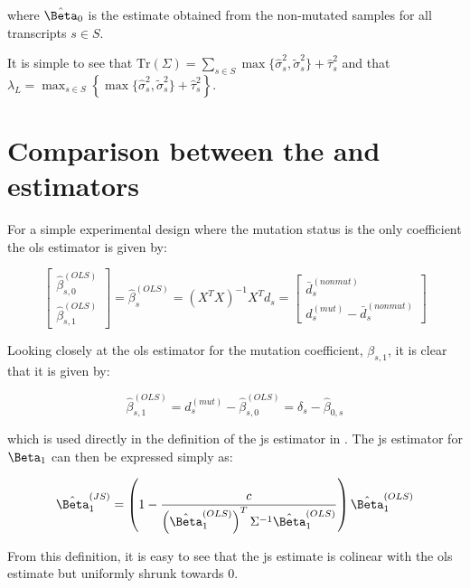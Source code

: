 where $\hat{\Beta}_0$ is the estimate obtained from the non-mutated samples for all transcripts $s \in S$.

It is simple to see that $\text{Tr}(\Sigma) = \sum_{s \in S} \max\{ \hat{\sigma}_s^2, \tilde{\sigma}_s^2 \} + \hat{\tau}_s^2$ and that $\lambda_L = \max_{s \in S} \left\{ \max\{ \hat{\sigma}_s^2, \tilde{\sigma}_s^2 \} + \hat{\tau}_s^2 \right\}$.

\section{Comparison between the  and  estimators}

For a simple experimental design where the mutation status is the only coefficient the \gls{ols} estimator is given by:

\begin{equation*}
  \begin{bmatrix}
    \hat{\beta}_{s,0}^{(OLS)} \\
    \hat{\beta}_{s,1}^{(OLS)}
  \end{bmatrix}
  = \hat{\beta}_s^{(OLS)}
  = (X^TX)^{-1}X^T d_s
  = \begin{bmatrix}
    \bar{d}_s^{(nonmut)} \\
    d_s^{(mut)} - \bar{d}_s^{(nonmut)}
  \end{bmatrix}
\end{equation*}

Looking closely at the \gls{ols} estimator for the mutation coefficient, $\beta_{s,1}$, it is clear that it is given by:

\begin{equation}
  \hat{\beta}_{s,1}^{(OLS)} = d_s^{(mut)} - \hat{\beta}_{s,0}^{(OLS)} = \delta_s - \hat{\beta}_{0,s}
\end{equation}

which is used directly in the definition of the \gls{js} estimator in .
The \gls{js} estimator for $\Beta_1$ can then be expressed simply as:

\begin{equation}
  \hat{\Beta}_1^{(JS)} = \left( 1 - \frac{c}{\left( \hat{\Beta}_1^{(OLS)} \right)^T \Sigma^{-1} \hat{\Beta}_1^{(OLS)}} \right) \hat{\Beta}_1^{(OLS)}
  \label{eqn:js_defn_ols}
\end{equation}

From this definition, it is easy to see that the \gls{js} estimate is colinear with the \gls{ols} estimate but uniformly shrunk towards 0.

